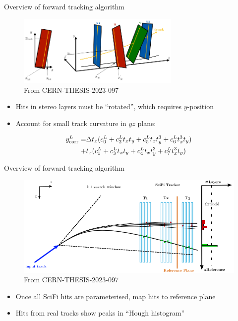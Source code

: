 \documentclass[xcolor={dvipsnames}]{beamer}
\begin{document}
\begin{frame}{Overview of forward tracking algorithm}
  \vspace{0.0cm}
  \begin{figure}[htb]
    \centering
    \includegraphics[width=0.7\textwidth]{Plots/StereoAngleCorrection.png}
    \caption*{\small From CERN-THESIS-2023-097}
  \end{figure}
  \begin{itemize}
    \item{Hits in stereo layers must be ``rotated'', which requires $y$-position}
    \item{Account for small track curvature in $yz$ plane:}
  \end{itemize}
  \begin{align*}
    y_{\rm corr}^L =& \Delta t_x(c_0^L + c_2^Lt_xt_y + c_5^Lt_xt_y^3 + c_6^Lt_x^3t_y) \\
    +& t_x(c_1^L + c_3^Lt_xt_y + c_4^Lt_xt_y^3 + c_7^Lt_x^3t_y)
  \end{align*}
\end{frame}

\begin{frame}{Overview of forward tracking algorithm}
  \vspace{0.0cm}
  \begin{figure}[htb]
    \centering
    \includegraphics[width=1\textwidth]{Plots/HoughTransform.png}
  \caption*{\small From CERN-THESIS-2023-097}
  \end{figure}
  \vspace{-0.3cm}
  \begin{itemize}
    \item{Once all SciFi hits are parameterised, map hits to reference plane}
    \item{Hits from real tracks show peaks in ``Hough histogram''}
  \end{itemize}
\end{frame}
\end{document}
